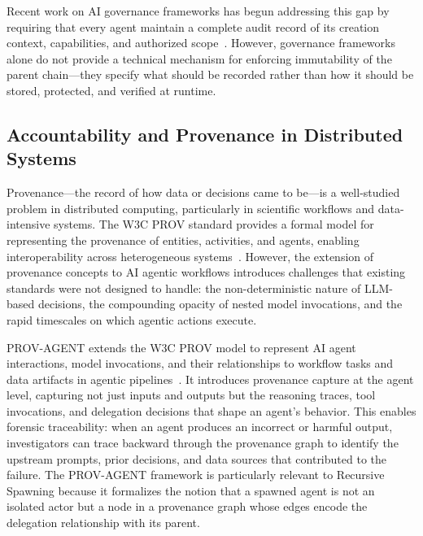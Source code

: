 Recent work on AI governance frameworks has begun addressing this gap by requiring that every agent maintain a complete audit record of its creation context, capabilities, and authorized scope~\cite{galileo_ai_governance}. However, governance frameworks alone do not provide a technical mechanism for enforcing immutability of the parent chain—they specify what should be recorded rather than how it should be stored, protected, and verified at runtime.

\subsection{Accountability and Provenance in Distributed Systems}

Provenance—the record of how data or decisions came to be—is a well-studied problem in distributed computing, particularly in scientific workflows and data-intensive systems. The W3C PROV standard provides a formal model for representing the provenance of entities, activities, and agents, enabling interoperability across heterogeneous systems~\cite{w3c_prov}. However, the extension of provenance concepts to AI agentic workflows introduces challenges that existing standards were not designed to handle: the non-deterministic nature of LLM-based decisions, the compounding opacity of nested model invocations, and the rapid timescales on which agentic actions execute.

PROV-AGENT extends the W3C PROV model to represent AI agent interactions, model invocations, and their relationships to workflow tasks and data artifacts in agentic pipelines~\cite{prov_agent_2025}. It introduces provenance capture at the agent level, capturing not just inputs and outputs but the reasoning traces, tool invocations, and delegation decisions that shape an agent's behavior. This enables forensic traceability: when an agent produces an incorrect or harmful output, investigators can trace backward through the provenance graph to identify the upstream prompts, prior decisions, and data sources that contributed to the failure. The PROV-AGENT framework is particularly relevant to Recursive Spawning because it formalizes the notion that a spawned agent is not an isolated actor but a node in a provenance graph whose edges encode the delegation relationship with its parent.

